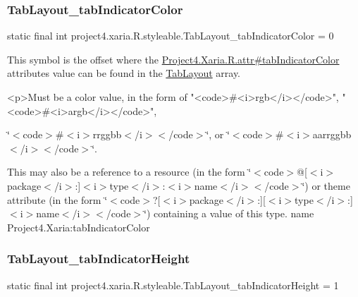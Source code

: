 \subsubsection{\texorpdfstring{Tab\+Layout\+\_\+tab\+Indicator\+Color}{TabLayout\_tabIndicatorColor}}
{\footnotesize\ttfamily static final int project4.\+xaria.\+R.\+styleable.\+Tab\+Layout\+\_\+tab\+Indicator\+Color = 0\hspace{0.3cm}{\ttfamily [static]}}

This symbol is the offset where the \hyperlink{}{Project4.\+Xaria.\+R.\+attr\#tab\+Indicator\+Color} attribute\textquotesingle{}s value can be found in the \hyperlink{classproject4_1_1xaria_1_1R_1_1styleable_ab6bfb1f97ae9fba16f4f90d50871d4a8}{Tab\+Layout} array.

\begin{DoxyVerb}      <p>Must be a color value, in the form of "<code>#<i>rgb</i></code>", "<code>#<i>argb</i></code>",
\end{DoxyVerb}
 \char`\"{}$<$code$>$\#$<$i$>$rrggbb$<$/i$>$$<$/code$>$\char`\"{}, or \char`\"{}$<$code$>$\#$<$i$>$aarrggbb$<$/i$>$$<$/code$>$\char`\"{}. 

This may also be a reference to a resource (in the form \char`\"{}$<$code$>$@\mbox{[}$<$i$>$package$<$/i$>$\+:\mbox{]}$<$i$>$type$<$/i$>$\+:$<$i$>$name$<$/i$>$$<$/code$>$\char`\"{}) or theme attribute (in the form \char`\"{}$<$code$>$?\mbox{[}$<$i$>$package$<$/i$>$\+:\mbox{]}\mbox{[}$<$i$>$type$<$/i$>$\+:\mbox{]}$<$i$>$name$<$/i$>$$<$/code$>$\char`\"{}) containing a value of this type.  name Project4.\+Xaria\+:tab\+Indicator\+Color \mbox{\label{classproject4_1_1xaria_1_1R_1_1styleable_aef58cd9fb4e80a28f816ba0af7d84799}} 
\subsubsection{\texorpdfstring{Tab\+Layout\+\_\+tab\+Indicator\+Height}{TabLayout\_tabIndicatorHeight}}
{\footnotesize\ttfamily static final int project4.\+xaria.\+R.\+styleable.\+Tab\+Layout\+\_\+tab\+Indicator\+Height = 1\hspace{0.3cm}{\ttfamily [static]}}

